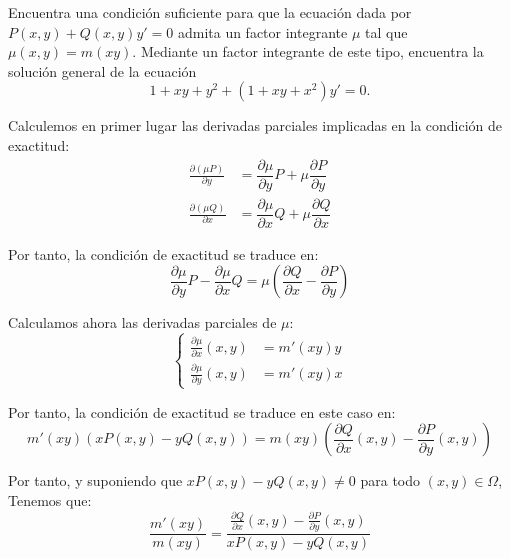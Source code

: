 \begin{ejercicio}
    Encuentra una condición suficiente para que la ecuación dada por $P(x, y) + Q(x, y)y' = 0$ admita un factor integrante $\mu$ tal que $\mu(x, y) = m(xy)$. Mediante un factor integrante de este tipo, encuentra la solución general de la ecuación
    \[
        1 + xy + y^2 + (1 + xy + x^2)y' = 0.
    \]

    Calculemos en primer lugar las derivadas parciales implicadas en la condición de exactitud:
    \begin{align*}
        \frac{\partial (\mu P)}{\partial y} &= \dfrac{\partial \mu}{\partial y}P+\mu\dfrac{\partial P}{\partial y}\\
        \frac{\partial (\mu Q)}{\partial x} &= \dfrac{\partial \mu}{\partial x}Q+\mu\dfrac{\partial Q}{\partial x}
    \end{align*}

    Por tanto, la condición de exactitud se traduce en:
    \begin{equation*}
        \dfrac{\partial \mu}{\partial y}P- \dfrac{\partial \mu}{\partial x}Q = \mu\left(\dfrac{\partial Q}{\partial x}-\dfrac{\partial P}{\partial y}\right)
    \end{equation*}

    Calculamos ahora las derivadas parciales de $\mu$:
    \begin{equation*}
        \left\{
            \begin{aligned}
                \frac{\partial \mu}{\partial x}(x,y) &= m'(xy)y\\
                \frac{\partial \mu}{\partial y}(x,y) &= m'(xy)x
            \end{aligned}
        \right.
    \end{equation*}

    Por tanto, la condición de exactitud se traduce en este caso en:
    \begin{equation*}
        m'(xy)(xP(x,y)-yQ(x,y)) = m(xy)\left(\frac{\partial Q}{\partial x}(x,y)-\frac{\partial P}{\partial y}(x,y)\right)
    \end{equation*}

    Por tanto, y suponiendo que $xP(x,y)-yQ(x,y)\neq 0$ para todo $(x,y)\in\Omega$, Tenemos que:
    \begin{equation*}
        \dfrac{m'(xy)}{m(xy)} = \dfrac{\frac{\partial Q}{\partial x}(x,y)-\frac{\partial P}{\partial y}(x,y)}{xP(x,y)-yQ(x,y)}
    \end{equation*}


\end{ejercicio}
